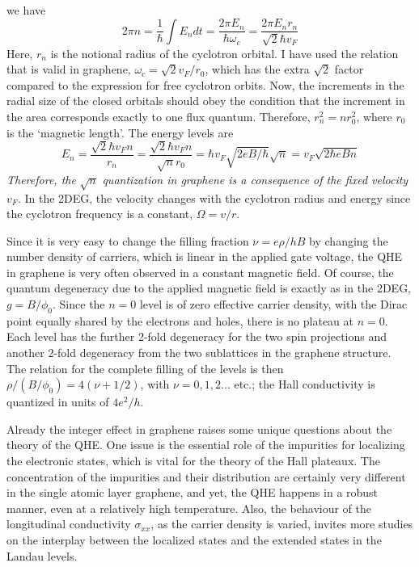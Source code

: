 \documentclass[aps,preprint,12pt,tightenlines]{revtex4}%
\begin{document}
we have%
\begin{equation}
2\pi n=\frac{1}{\hbar}\int E_{n}dt=\frac{2\pi E_{n}}{\hbar\omega_{c}}%
=\frac{2\pi E_{n}r_{n}}{\sqrt{2}\hbar v_{F}}%
\end{equation}
Here, $r_{n}$ is the notional radius of the cyclotron orbital. I have used the
relation that is valid in graphene, $\omega_{c}=\sqrt{2}v_{F}/r_{0}$, which
has the extra $\sqrt{2}$ factor compared to the expression for free cyclotron
orbits. Now, the increments in the radial size of the closed orbitals should
obey the condition that the increment in the area corresponds exactly to one
flux quantum. Therefore, $r_{n}^{2}=nr_{0}^{2}$, where $r_{0}$ is the
`magnetic length'. The energy levels are%
\begin{equation}
E_{n}=\frac{\sqrt{2}\hbar v_{F}n}{r_{n}}=\frac{\sqrt{2}\hbar v_{F}n}{\sqrt
{n}r_{0}}=\hbar v_{F}\sqrt{2eB/\hbar}\sqrt{n}=v_{F}\sqrt{2\hbar eBn}%
\end{equation}
\emph{Therefore, the }$\sqrt{n}$\emph{ quantization in graphene is a
consequence of the fixed velocity }$v_{F}$. In the 2DEG, the velocity changes
with the cyclotron radius and energy since the cyclotron frequency is a
constant, $\Omega=v/r$.

Since it is very easy to change the filling fraction $\nu=e\rho/hB$ by
changing the number density of carriers, which is linear in the applied gate
voltage, the QHE in graphene is very often observed in a constant magnetic
field. Of course, the quantum degeneracy due to the applied magnetic field is
exactly as in the 2DEG, $g=B/\phi_{0}$. Since the $n=0$ level is of zero
effective carrier density, with the Dirac point equally shared by the
electrons and holes, there is no plateau at $n=0$. Each level has the further
2-fold degeneracy for the two spin projections and another 2-fold degeneracy
from the two sublattices in the graphene structure. The relation for the
complete filling of the levels is then $\rho/\left(  B/\phi_{0}\right)
=4\left(  \nu+1/2\right)  $, with $\nu=0,1,2...$ etc.; the Hall conductivity
is quantized in units of $4e^{2}/h$.

Already the integer effect in graphene raises some unique questions about the
theory of the QHE. One issue is the essential role of the impurities for
localizing the electronic states, which is vital for the theory of the Hall
plateaux. The concentration of the impurities and their distribution are
certainly very different in the single atomic layer graphene, and yet, the QHE
happens in a robust manner, even at a relatively high temperature. Also, the
behaviour of the longitudinal conductivity $\sigma_{xx}$, as the carrier
density is varied, invites more studies on the interplay between the localized
states and the extended states in the Landau levels.
\end{document}

